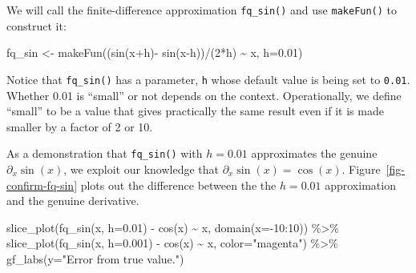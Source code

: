 \documentclass[
  letterpaper,
  DIV=11,
  numbers=noendperiod,
  oneside]{scrreprt}
\newenvironment{Shaded}{\begin{snugshade}}{\end{snugshade}}
\newcommand{\AttributeTok}[1]{\textcolor[rgb]{0.40,0.46,0.14}{#1}}
\newcommand{\DecValTok}[1]{\textcolor[rgb]{0.68,0.00,0.00}{#1}}
\newcommand{\FloatTok}[1]{\textcolor[rgb]{0.68,0.00,0.00}{#1}}
\newcommand{\FunctionTok}[1]{\textcolor[rgb]{0.28,0.35,0.67}{#1}}
\newcommand{\NormalTok}[1]{\textcolor[rgb]{0.00,0.46,0.62}{#1}}
\newcommand{\OtherTok}[1]{\textcolor[rgb]{0.00,0.46,0.62}{#1}}
\newcommand{\SpecialCharTok}[1]{\textcolor[rgb]{0.37,0.37,0.37}{#1}}
\newcommand{\StringTok}[1]{\textcolor[rgb]{0.13,0.47,0.30}{#1}}
\begin{document}
We will call the finite-difference approximation \texttt{fq\_sin()} and
use \texttt{makeFun()} to construct it:

\begin{Shaded}
\begin{Highlighting}[]
\NormalTok{fq\_sin }\OtherTok{\textless{}{-}} \FunctionTok{makeFun}\NormalTok{((}\FunctionTok{sin}\NormalTok{(x}\SpecialCharTok{+}\NormalTok{h)}\SpecialCharTok{{-}} \FunctionTok{sin}\NormalTok{(x}\SpecialCharTok{{-}}\NormalTok{h))}\SpecialCharTok{/}\NormalTok{(}\DecValTok{2}\SpecialCharTok{*}\NormalTok{h) }\SpecialCharTok{\textasciitilde{}}\NormalTok{ x, }\AttributeTok{h=}\FloatTok{0.01}\NormalTok{)}
\end{Highlighting}
\end{Shaded}

Notice that \texttt{fq\_sin()} has a parameter, \texttt{h} whose default
value is being set to \texttt{0.01}. Whether 0.01 is ``small'' or not
depends on the context. Operationally, we define ``small'' to be a value
that gives practically the same result even if it is made smaller by a
factor of 2 or 10.

As a demonstration that \texttt{fq\_sin()} with \(h=0.01\) approximates
the genuine \(\partial_x \sin(x)\), we exploit our knowledge that
\(\partial_x \sin(x) = \cos(x)\). Figure~\ref{fig-confirm-fq-sin} plots
out the difference between the the \(h=0.01\) approximation and the
genuine derivative.

\begin{Shaded}
\begin{Highlighting}[]
\FunctionTok{slice\_plot}\NormalTok{(}\FunctionTok{fq\_sin}\NormalTok{(x, }\AttributeTok{h=}\FloatTok{0.01}\NormalTok{) }\SpecialCharTok{{-}} \FunctionTok{cos}\NormalTok{(x) }\SpecialCharTok{\textasciitilde{}}\NormalTok{ x, }\FunctionTok{domain}\NormalTok{(}\AttributeTok{x=}\SpecialCharTok{{-}}\DecValTok{10}\SpecialCharTok{:}\DecValTok{10}\NormalTok{)) }\SpecialCharTok{\%\textgreater{}\%}
  \FunctionTok{slice\_plot}\NormalTok{(}\FunctionTok{fq\_sin}\NormalTok{(x, }\AttributeTok{h=}\FloatTok{0.001}\NormalTok{) }\SpecialCharTok{{-}} \FunctionTok{cos}\NormalTok{(x) }\SpecialCharTok{\textasciitilde{}}\NormalTok{ x, }\AttributeTok{color=}\StringTok{"magenta"}\NormalTok{) }\SpecialCharTok{\%\textgreater{}\%}
  \FunctionTok{gf\_labs}\NormalTok{(}\AttributeTok{y=}\StringTok{"Error from true value."}\NormalTok{)}
\end{Highlighting}
\end{Shaded}
\end{document}
